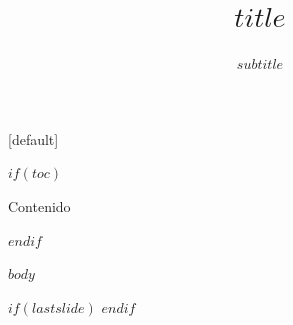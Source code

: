 \documentclass[11pt,xcolor={dvipsnames},hyperref={pdftex,pdfpagemode=UseNone,hidelinks,pdfdisplaydoctitle=true},usepdftitle=false]{beamer}
\title{$title$}
\subtitle{$subtitle$}
\begin{document}
[default]

\frame{\titlepage}

$if(toc)$
\begin{frame}{Contenido}
  \tableofcontents
\end{frame}
$endif$


\AtBeginSection[]{
  \begin{frame}
    \vfill
    \centering
    \heading{\insertsectionhead}
    \vfill
  \end{frame}
}


$body$

$if(lastslide)$
\lastslide
$endif$
\end{document}
